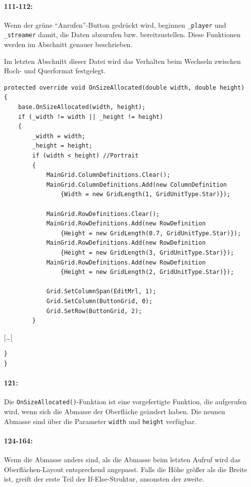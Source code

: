 \paragraph{111-112:} Wenn der grüne \enquote{Anrufen}-Button gedrückt wird, beginnen \texttt{\_player} und \texttt{\_streamer} damit, die Daten abzurufen bzw. bereitzustellen. Diese Funktionen werden im Abschnitt  genauer beschrieben.

Im letzten Abschnitt dieser Datei wird das Verhalten beim Wechseln zwischen Hoch- und Querformat festgelegt.
\begin{lstlisting}[firstnumber=121]
protected override void OnSizeAllocated(double width, double height)
{
    base.OnSizeAllocated(width, height);
    if (_width != width || _height != height)
    {
        _width = width;
        _height = height;
        if (width < height) //Portrait
        {
            MainGrid.ColumnDefinitions.Clear();
            MainGrid.ColumnDefinitions.Add(new ColumnDefinition
                {Width = new GridLength(1, GridUnitType.Star)});

            MainGrid.RowDefinitions.Clear();
            MainGrid.RowDefinitions.Add(new RowDefinition
                {Height = new GridLength(0.7, GridUnitType.Star)});
            MainGrid.RowDefinitions.Add(new RowDefinition
                {Height = new GridLength(3, GridUnitType.Star)});
            MainGrid.RowDefinitions.Add(new RowDefinition
                {Height = new GridLength(2, GridUnitType.Star)});

            Grid.SetColumnSpan(EditMrl, 1);
            Grid.SetColumn(ButtonGrid, 0);
            Grid.SetRow(ButtonGrid, 2);
        }
\end{lstlisting}
[\dots]
\begin{lstlisting}[firstnumber=164]
    }
}
\end{lstlisting}
\paragraph{121:} Die \texttt{OnSizeAllocated()}-Funktion ist eine vorgefertigte Funktion, die aufgerufen wird, wenn sich die Abmasse der Oberfläche geändert haben.
Die neunen Abmasse sind über die Parameter \texttt{width} und \texttt{height} verfügbar.
\paragraph{124-164:} Wenn die Abmasse anders sind, als die Abmasse beim letzten Aufruf wird das Oberflächen-Layout entsprechend angepasst.
Falls die Höhe größer als die Breite ist, greift der erste Teil der If-Else-Struktur, ansonsten der zweite.
